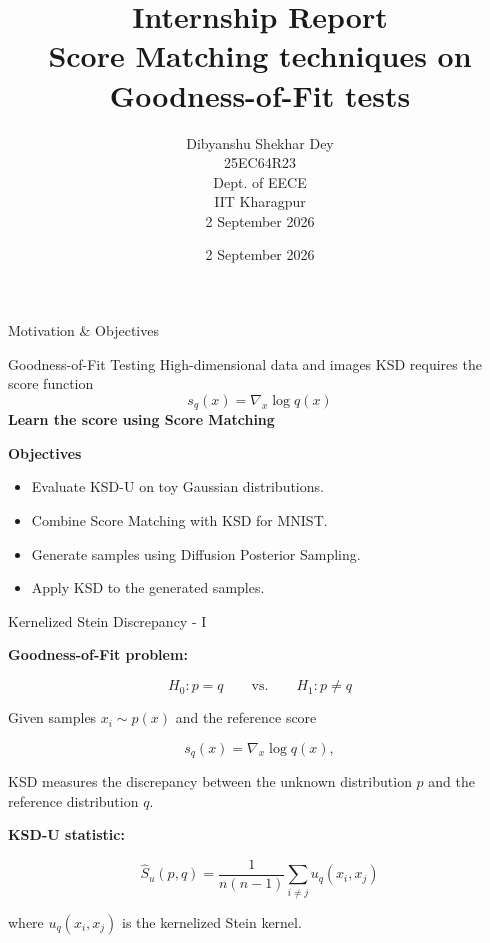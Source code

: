 \documentclass[aspectratio=43]{beamer}
\title{Internship Report\\[2mm]Score Matching techniques on Goodness-of-Fit tests}
\author{
    Dibyanshu Shekhar Dey\\[2mm]
    25EC64R23\\[5mm]
    Dept. of EECE\\[2mm]
    IIT Kharagpur\\[5mm]
    2 September 2026
}
\date{2 September 2026}
\begin{document}
\begin{frame}
    \titlepage
\end{frame}


\begin{frame}{Motivation \& Objectives}
\begin{center}
\textcolor{MITBlue}{\large Goodness-of-Fit Testing}
\vspace{0.1cm}
High-dimensional data and images
\vspace{0.1cm}
KSD requires the score function
\[s_q(x)=\nabla_x \log q(x)\]
\vspace{0.1cm}
\textcolor{MITBlue}{\textbf{Learn the score using Score Matching}}
\end{center}
\vspace{0.1cm}
\textbf{Objectives}
\begin{itemize}
    \item Evaluate KSD-U on toy Gaussian distributions.
    \item Combine Score Matching with KSD for MNIST.
    \item Generate samples using Diffusion Posterior Sampling.
    \item Apply KSD to the generated samples.
\end{itemize}
\end{frame}

\begin{frame}{Kernelized Stein Discrepancy - I}

\textbf{Goodness-of-Fit problem:}

\[
H_0:p=q
\qquad\text{vs.}\qquad
H_1:p\neq q
\]

\vspace{0.2cm}

Given samples $x_i\sim p(x)$ and the reference score

\[
s_q(x)=\nabla_x\log q(x),
\]

KSD measures the discrepancy between the unknown distribution
$p$ and the reference distribution $q$.

\vspace{0.2cm}

\textbf{KSD-U statistic:}

\[
\boxed{
\widehat{S}_u(p,q)
=
\frac{1}{n(n-1)}
\sum_{i\neq j}u_q(x_i,x_j)
}
\]

where $u_q(x_i,x_j)$ is the kernelized Stein kernel.
\end{frame}
\end{document}
